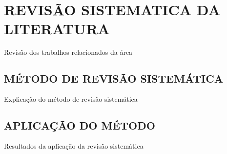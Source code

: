 
\chapter{REVISÃO SISTEMATICA DA LITERATURA}
\label{chap:revisaoSistematica}
Revisão dos trabalhos relacionados da área

\section{MÉTODO DE REVISÃO SISTEMÁTICA}
\label{sec:metodoRevisao}
Explicação do método de revisão sistemática

\section{APLICAÇÃO DO MÉTODO}
\label{sec:aplicacaoRevisao}
Resultados da aplicação da revisão sistemática